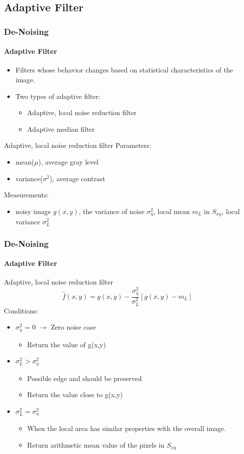 \documentclass{beamer}
\begin{document}
\subsection{Adaptive Filter}
\begin{frame}
\frametitle{De-Noising}
\framesubtitle{Adaptive Filter}
\begin{itemize}
	\item Filters whose behavior changes based on statistical characteristics of the image. 
	\item Two types of adaptive filter: 
	\begin{itemize}
		\item Adaptive, local noise reduction filter 
		\item Adaptive median filter
	\end{itemize}
\end{itemize}
\begin{block}{Adaptive, local noise reduction filter}
Parameters: 
\begin{itemize}
	\item mean($\mu$), average gray level 
	\item variance($\sigma^2$), average contrast
\end{itemize}
Measurements:
\begin{itemize}
	\item noisy image $g(x,y)$, the variance of noise $\sigma_{\eta}^2$, local mean $m_{L}$ in $S_{xy}$, local variance $\sigma_{L}^2$
\end{itemize}

\end{block}
\end{frame}
\begin{frame}
\frametitle{De-Noising}
\framesubtitle{Adaptive Filter}
\begin{block}{Adaptive, local noise reduction filter}
$$\hat{f}(x,y) = g(x,y)-\frac{\sigma_{\eta}^{2}}{\sigma_{L}^{2}}[g(x,y)-m_{L}] $$
Conditions: 
\begin{itemize}
	\item $\sigma^2_{\eta}$ =  0 $\rightarrow$ Zero noise case 
	\begin{itemize}
	\item Return the value of g(x,y) 
	\end{itemize}	 
	\item $\sigma^{2}_{L} > \sigma^{2}_{\eta}$
	\begin{itemize}
	\item Possible edge and should be preserved 
	\item Return the value close to g(x,y) 
	\end{itemize}	 
	\item $\sigma^{2}_{L} = \sigma^{2}_{\eta}$ 
	\begin{itemize}
	\item When the local area has similar properties with the overall image.
	\item Return arithmetic mean value of the pixels in $S_{xy}$
	\end{itemize}
\end{itemize}
\end{block}
\end{frame}
\end{document}
